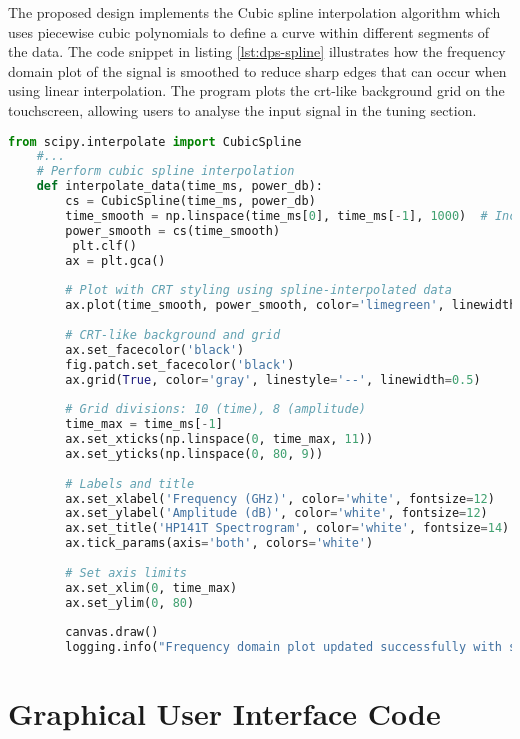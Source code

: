 \documentclass[class=report,11pt,crop=false]{standalone}
\begin{document}
	The proposed design implements the Cubic spline interpolation algorithm which uses piecewise cubic polynomials to define a curve within different segments of the data. The code snippet in listing \ref{lst:dps-spline} illustrates how the frequency domain plot of the signal is smoothed to reduce sharp edges that can occur when using linear interpolation. The program plots the \acrshort{crt}-like background grid on the touchscreen, allowing users to analyse the input signal in the tuning section.
	
	\begin{lstlisting}[language=Python, caption={Code snippet for performing polynomial interpolation in the \acrshort{dps} to the spectrogram a smoother appearance.}, label={lst:dps-spline}]
	from scipy.interpolate import CubicSpline
	#...
	# Perform cubic spline interpolation
	def interpolate_data(time_ms, power_db):
		cs = CubicSpline(time_ms, power_db)
		time_smooth = np.linspace(time_ms[0], time_ms[-1], 1000)  # Increase resolution
		power_smooth = cs(time_smooth)
		 plt.clf()
		ax = plt.gca()
		
		# Plot with CRT styling using spline-interpolated data
		ax.plot(time_smooth, power_smooth, color='limegreen', linewidth=2)
		
		# CRT-like background and grid
		ax.set_facecolor('black')
		fig.patch.set_facecolor('black')
		ax.grid(True, color='gray', linestyle='--', linewidth=0.5)
		
		# Grid divisions: 10 (time), 8 (amplitude)
		time_max = time_ms[-1]
		ax.set_xticks(np.linspace(0, time_max, 11))
		ax.set_yticks(np.linspace(0, 80, 9))
		
		# Labels and title
		ax.set_xlabel('Frequency (GHz)', color='white', fontsize=12)
		ax.set_ylabel('Amplitude (dB)', color='white', fontsize=12)
		ax.set_title('HP141T Spectrogram', color='white', fontsize=14)
		ax.tick_params(axis='both', colors='white')
		
		# Set axis limits
		ax.set_xlim(0, time_max)
		ax.set_ylim(0, 80)
		
		canvas.draw()
		logging.info("Frequency domain plot updated successfully with spline interpolation")
	\end{lstlisting}

	\section{Graphical User Interface Code}
\end{document}
